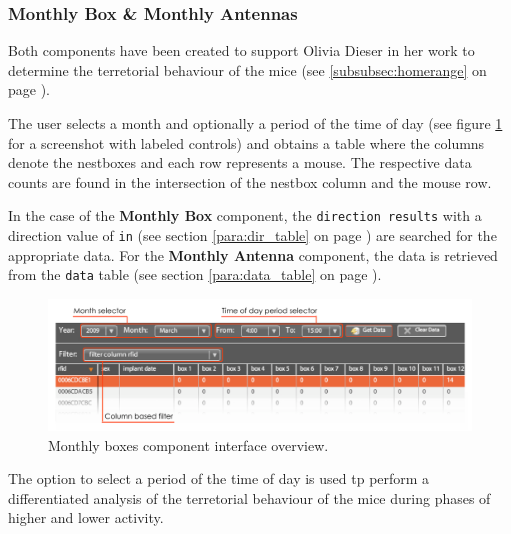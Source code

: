 \subsubsection{Monthly Box \& Monthly Antennas}
\label{subsubsec:monthbox}

Both components have been created to support Olivia Dieser in her work to determine the terretorial behaviour of the mice (see \ref{subsubsec:homerange} on page \pageref{subsubsec:homerange}).

The user selects a month and optionally a period of the time of day (see figure \ref{fig:month_box_ant} for a screenshot with labeled controls) and obtains a table where the columns denote the nestboxes and each row represents a mouse. The respective data counts are found in the intersection of the nestbox column and the mouse row.

In the case of the \textbf{Monthly Box} component, the \lstinline|direction results| with a direction value of \lstinline|in| (see section \ref{para:dir_table} on page \pageref{para:dir_table}) are searched for the appropriate data. For the \textbf{Monthly Antenna} component, the data is retrieved from the \lstinline|data| table (see section \ref{para:data_table} on page \pageref{para:data_table}).

\begin{figure}[htpb]
\begin{center}
  \includegraphics[width=\textwidth]{assets/pdf/month_box_ant.pdf}
  \caption[Monthly boxes component interface]{Monthly boxes component interface overview.}
  \label{fig:month_box_ant}
\end{center}
\end{figure}

The option to select a period of the time of day is used tp perform a differentiated analysis of the terretorial behaviour of the mice during phases of higher and lower activity.